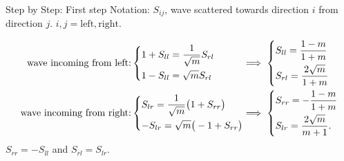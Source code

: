 \documentclass{beamer}
\begin{document}
  \begin{frame}{Step by Step: First step}
    Notation: $S_{ij}$, wave scattered towards direction $i$ from direction $j$. $i,j=\text{left},\text{right}$.
    \begin{figure}
      \centering
    \end{figure}
    \vspace{-1em}\pause
    \begin{align*}
      \text{wave incoming from left:} & \begin{dcases}
        1 + S_{ll} = \frac{1}{\sqrt{m}} S_{rl} \\
        1 - S_{ll} = \sqrt{m} S_{rl}
      \end{dcases}
      && \!\!\!\!\!\!\!\!\implies \begin{dcases}
        S_{ll} = \frac{1-m}{1+m} \\
        S_{rl} = \frac{2\sqrt{m}}{1+m}
      \end{dcases}
      \\
      \text{wave incoming from right:} & \begin{dcases}
        S_{lr} = \frac{1}{\sqrt{m}} \big( 1 + S_{rr} \big) \\
        -S_{lr} = \sqrt{m} \big( - 1 + S_{rr} \big)
      \end{dcases}
      && \!\!\!\!\!\!\!\!\implies \begin{dcases}
        S_{rr} = -\frac{1-m}{1+m} \\
        S_{lr} = \frac{2\sqrt{m}}{m+1}.
      \end{dcases}
    \end{align*}
    $S_{rr} = - S_{ll}$ and $S_{rl} = S_{lr}$.
  \end{frame}
\end{document}
